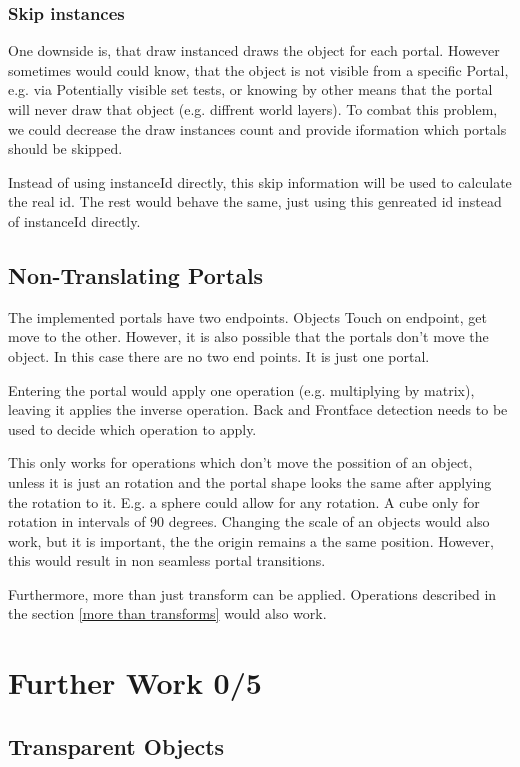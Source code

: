\subsubsection{Skip instances}
One downside is, that draw instanced draws the object for each portal. However sometimes would could know, that the object is not visible from a specific Portal, e.g. via Potentially visible set tests, or knowing by other means that the portal will never draw that object (e.g. diffrent world layers).
To combat this problem, we could decrease the draw instances count and provide iformation which portals should be skipped.

Instead of using instanceId directly, this skip information will be used to calculate the real id. The rest would behave the same, just using this genreated id instead of instanceId directly.



\subsection{Non-Translating Portals}
The implemented portals have two endpoints. Objects Touch on endpoint, get move to the other. However, it is also possible that the portals don't move the object. In this case there are no two end points. It is just one portal.

Entering the portal would apply one operation (e.g. multiplying by matrix), leaving it applies the inverse operation. Back and Frontface detection needs to be used to decide which operation to apply.


This only works for operations which don't move the possition of an object, unless it is just an rotation and the portal shape looks the same after applying the rotation to it. E.g. a sphere could allow for any rotation. A cube only for rotation in intervals of 90 degrees.
Changing the scale of an objects would also work, but it is important, the the origin remains a the same position. However, this would result in non seamless portal transitions.

Furthermore, more than just transform can be applied. Operations described in the section \ref{more than transforms} would also work.



\section{Further Work 0/5}
\subsection{Transparent Objects}

